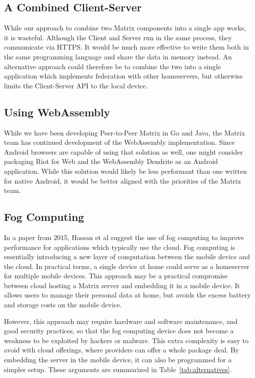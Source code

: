 \subsection{A Combined Client-Server}\label{subsec:combined_client_server}
While our approach to combine two Matrix components into a single app works, it is wasteful.
Although the Client and Server run in the same process, they communicate via HTTPS\@.
It would be much more effective to write them both in the same programming language and share the data in memory instead.
An alternative approach could therefore be to combine the two into a single application which implements federation with other homeservers, but otherwise limits the Client-Server API to the local device.

\subsection{Using WebAssembly}\label{subsec:using_webassembly}
While we have been developing Peer-to-Peer Matrix in Go and Java, the Matrix team has continued development of the WebAssembly implementation.
Since Android browsers are capable of using that solution as well, one might consider packaging Riot for Web and the WebAssembly Dendrite as an Android application.
While this solution would likely be less performant than one written for native Android, it would be better aligned with the priorities of the Matrix team.

\subsection{Fog Computing}\label{sec:fog_computing}
In a paper from 2015, Hassan et al suggest the use of fog computing to improve performance for applications which typically use the cloud\cite{hassan2015help}.
Fog computing is essentially introducing a new layer of computation between the mobile device and the cloud.
In practical terms, a single device at home could serve as a homeserver for multiple mobile devices.
This approach may be a practical compromise between cloud hosting a Matrix server and embedding it in a mobile device.
It allows users to manage their personal data at home, but avoids the excess battery and storage costs on the mobile device.

However, this approach may require hardware and software maintenance, and good security practices, so that the fog computing device does not become a weakness to be exploited by hackers or malware.
This extra complexity is easy to avoid with cloud offerings, where providers can offer a whole package deal.
By embedding the server in the mobile device, it can also be programmed for a simpler setup.
These arguments are summarized in Table~\ref{tab:alternatives}.


